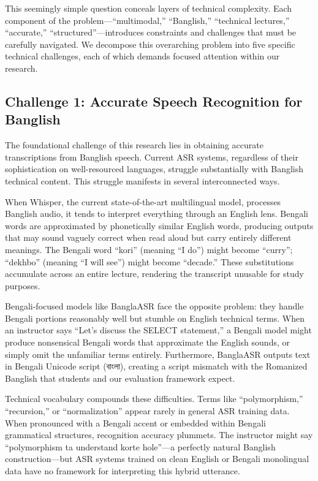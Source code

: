 This seemingly simple question conceals layers of technical complexity. Each component of the problem---``multimodal,'' ``Banglish,'' ``technical lectures,'' ``accurate,'' ``structured''---introduces constraints and challenges that must be carefully navigated. We decompose this overarching problem into five specific technical challenges, each of which demands focused attention within our research.

\subsection{Challenge 1: Accurate Speech Recognition for Banglish}

The foundational challenge of this research lies in obtaining accurate transcriptions from Banglish speech. Current ASR systems, regardless of their sophistication on well-resourced languages, struggle substantially with Banglish technical content. This struggle manifests in several interconnected ways.

When Whisper, the current state-of-the-art multilingual model, processes Banglish audio, it tends to interpret everything through an English lens. Bengali words are approximated by phonetically similar English words, producing outputs that may sound vaguely correct when read aloud but carry entirely different meanings. The Bengali word ``kori'' (meaning ``I do'') might become ``curry''; ``dekhbo'' (meaning ``I will see'') might become ``decade.'' These substitutions accumulate across an entire lecture, rendering the transcript unusable for study purposes.

Bengali-focused models like BanglaASR face the opposite problem: they handle Bengali portions reasonably well but stumble on English technical terms. When an instructor says ``Let's discuss the SELECT statement,'' a Bengali model might produce nonsensical Bengali words that approximate the English sounds, or simply omit the unfamiliar terms entirely. Furthermore, BanglaASR outputs text in Bengali Unicode script (বাংলা), creating a script mismatch with the Romanized Banglish that students and our evaluation framework expect.

Technical vocabulary compounds these difficulties. Terms like ``polymorphism,'' ``recursion,'' or ``normalization'' appear rarely in general ASR training data. When pronounced with a Bengali accent or embedded within Bengali grammatical structures, recognition accuracy plummets. The instructor might say ``polymorphism ta understand korte hole''---a perfectly natural Banglish construction---but ASR systems trained on clean English or Bengali monolingual data have no framework for interpreting this hybrid utterance.

